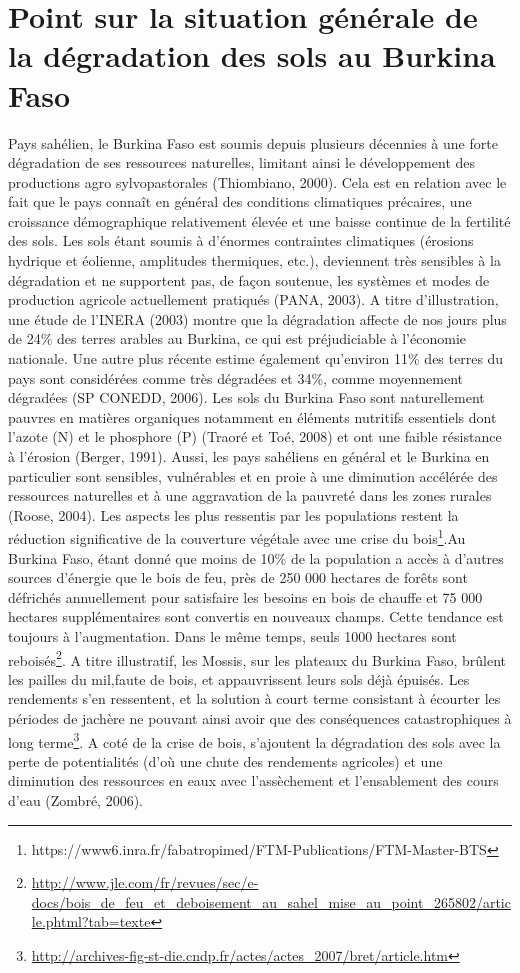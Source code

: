 \documentclass[a4paper,11pt]{article}
\begin{document}
\section{Point sur la situation générale de la dégradation des sols au Burkina Faso}

Pays sahélien, le Burkina Faso est soumis depuis plusieurs décennies à
une forte dégradation de ses ressources naturelles, limitant ainsi le
développement des productions agro sylvopastorales (Thiombiano,
2000). Cela est en relation avec le fait que le pays connaît en
général des conditions climatiques précaires, une croissance
démographique relativement élevée et une baisse continue de la
fertilité des sols. Les sols étant soumis à d’énormes contraintes
climatiques (érosions hydrique et éolienne, amplitudes thermiques,
etc.), deviennent très sensibles à la dégradation et ne supportent
pas, de façon soutenue, les systèmes et modes de production agricole
actuellement pratiqués (PANA, 2003). A titre d’illustration, une étude
de l’INERA (2003) montre que la dégradation affecte de nos jours plus
de 24\% des terres arables au Burkina, ce qui est préjudiciable à
l’économie nationale. Une autre plus récente estime également
qu’environ 11\% des terres du pays sont considérées comme très
dégradées et 34\%, comme moyennement dégradées (SP CONEDD, 2006).  Les
sols du Burkina Faso sont naturellement pauvres en matières organiques
notamment en éléments nutritifs essentiels dont l’azote (N) et le
phosphore (P) (Traoré et Toé, 2008) et ont une faible résistance à
l’érosion (Berger, 1991). Aussi, les pays sahéliens en général et le
Burkina en particulier sont sensibles, vulnérables et en proie à une
diminution accélérée des ressources naturelles et à une aggravation de
la pauvreté dans les zones rurales (Roose, 2004). Les aspects les plus
ressentis par les populations restent la réduction significative de la
couverture végétale avec une crise du bois\footnote{https://www6.inra.fr/fabatropimed/FTM-Publications/FTM-Master-BTS}.Au Burkina Faso, étant donné que moins de 10\% de la population a accès à d’autres sources d’énergie que le bois de feu, près de 250 000 hectares de forêts sont défrichés annuellement pour satisfaire les besoins en bois de chauffe et 75 000 hectares supplémentaires sont convertis en nouveaux champs. Cette tendance est toujours à l’augmentation. Dans le même temps, seuls 1000 hectares sont reboisés\footnote{\url{http://www.jle.com/fr/revues/sec/e-docs/bois_de_feu_et_deboisement_au_sahel_mise_au_point_265802/article.phtml?tab=texte}}. A titre illustratif, les Mossis, sur les plateaux du Burkina Faso, brûlent les pailles du mil,faute de bois, et appauvrissent leurs sols déjà épuisés. Les rendements s’en ressentent, et la solution à court terme consistant à écourter les périodes de jachère ne pouvant ainsi avoir que des conséquences catastrophiques à long terme\footnote{\url{http://archives-fig-st-die.cndp.fr/actes/actes_2007/bret/article.htm}}. A coté de la crise de bois, s’ajoutent la dégradation des sols avec la perte de potentialités (d’où une chute des rendements agricoles) et une diminution des ressources en eaux avec l’assèchement et l’ensablement
des cours d’eau (Zombré, 2006)\cite{Doggett_1988}.
\end{document}
